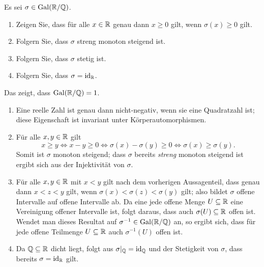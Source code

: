\begin{question}[subtitle = Galoisgruppe von $\Real/\Rational$]
  Es sei $\sigma \in \operatorname{Gal}(\mathbb{R}/\mathbb{Q})$.
  \begin{enumerate}
    \item
      Zeigen Sie, dass für alle $x \in \mathbb{R}$ genau dann $x \geq 0$ gilt, wenn $\sigma(x) \geq 0$ gilt.
    \item
      Folgern Sie, dass $\sigma$ streng monoton steigend ist.
    \item
      Folgern Sie, dass $\sigma$ stetig ist.
    \item
      Folgern Sie, dass $\sigma = \operatorname{id}_{\mathbb{R}}$.
  \end{enumerate}
  Das zeigt, dass $\operatorname{Gal}(\mathbb{R}/\mathbb{Q}) = 1$.
\end{question}


\begin{solution}
  \begin{enumerate}
    \item
      Eine reelle Zahl ist genau dann nicht-negativ, wenn sie eine Quadratzahl ist;
      diese Eigenschaft ist invariant unter Körperautomorphismen.
      
    \item
      Für alle $x, y \in \mathbb{R}$ gilt
      \[
              x \geq y
        \iff  x - y \geq 0
        \iff  \sigma(x) - \sigma(y) \geq 0
        \iff  \sigma(x) \geq \sigma(y).
      \]
      Somit ist $\sigma$ monoton steigend;
      dass $\sigma$ bereits \emph{streng} monoton steigend ist ergibt sich aus der Injektivität von $\sigma$.
      
    \item
      Für alle $x, y \in \mathbb{R}$ mit $x < y$ gilt nach dem vorherigen Aussagenteil, dass genau dann $x < z < y$ gilt, wenn 
      $\sigma(x) < \sigma(z) < \sigma(y)$ gilt; also bildet $\sigma$ offene Intervalle auf offene Intervalle ab.
      Da eine jede offene Menge $U \subseteq \mathbb{R}$ eine Vereinigung offener Intervalle ist, folgt daraus, dass auch $\sigma(U) \subseteq \mathbb{R}$ offen ist.
      Wendet man dieses Resultat auf $\sigma^{-1} \in \operatorname{Gal}(\mathbb{R}/\mathbb{Q})$ an, so ergibt sich, dass für jede offene Teilmenge $U \subseteq \mathbb{R}$ auch $\sigma^{-1}(U)$ offen ist.
    
    \item
      Da $\mathbb{Q} \subseteq \mathbb{R}$ dicht liegt, folgt aus $\sigma|_{\mathbb{Q}} = \operatorname{id}_{\mathbb{Q}}$ und der Stetigkeit von $\sigma$, dass bereits $\sigma = \operatorname{id}_{\mathbb{R}}$ gilt.
  \end{enumerate}
\end{solution}


